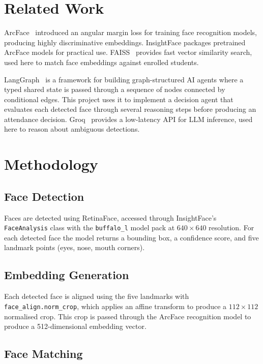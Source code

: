 \documentclass[conference]{IEEEtran}
\begin{document}
\section{Related Work}

ArcFace~\cite{deng2019arcface} introduced an angular margin loss for training face recognition models, producing highly discriminative embeddings. InsightFace packages pretrained ArcFace models for practical use. FAISS~\cite{johnson2019faiss} provides fast vector similarity search, used here to match face embeddings against enrolled students.

LangGraph~\cite{langgraph2024} is a framework for building graph-structured AI agents where a typed shared state is passed through a sequence of nodes connected by conditional edges. This project uses it to implement a decision agent that evaluates each detected face through several reasoning steps before producing an attendance decision. Groq~\cite{groq2024} provides a low-latency API for LLM inference, used here to reason about ambiguous detections.

\section{Methodology}

\subsection{Face Detection}

Faces are detected using RetinaFace, accessed through InsightFace's \texttt{FaceAnalysis} class with the \texttt{buffalo\_l} model pack at $640 \times 640$ resolution. For each detected face the model returns a bounding box, a confidence score, and five landmark points (eyes, nose, mouth corners).

\subsection{Embedding Generation}

Each detected face is aligned using the five landmarks with \texttt{face\_align.norm\_crop}, which applies an affine transform to produce a $112 \times 112$ normalised crop. This crop is passed through the ArcFace recognition model to produce a 512-dimensional embedding vector.

\subsection{Face Matching}
\end{document}
